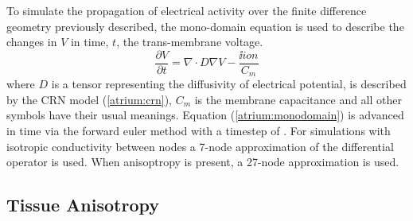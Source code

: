 To simulate the propagation of electrical activity over the finite difference
geometry previously described, the mono-domain equation is used to describe the
changes in $V$ in time, $t$, the trans-membrane voltage.
\begin{equation}
\label{atrium:monodomain}
\frac{\partial V}{\partial t} = \nabla\cdot D \nabla V - \frac{\ii{ion}}{C_{m}}
\end{equation}
where $D$ is a tensor representing the diffusivity of electrical potential,  is described by the
CRN model (\ref{atrium:crn}), $C_{m}$ is the membrane capacitance and all other
symbols have their usual meanings.  Equation (\ref{atrium:monodomain}) is
advanced in time via the forward euler method with a timestep of .  For
simulations with isotropic conductivity between nodes a 7-node approximation of
the differential operator is used.  When anisoptropy is present, a 27-node
approximation is used.

\subsection{Tissue Anisotropy}

